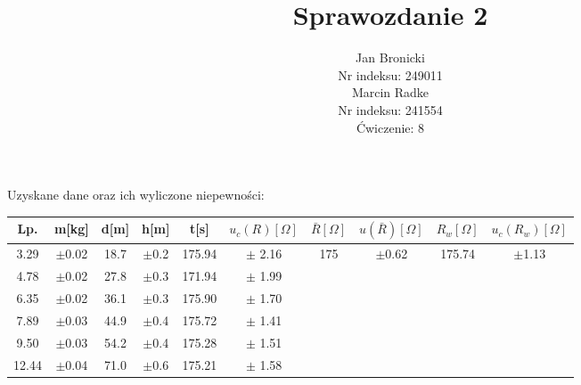 \documentclass{article}
\title{Sprawozdanie 2}
\author{Jan Bronicki \\
Nr indeksu: 249011\\
Marcin Radke\\
Nr indeksu: 241554\\
Ćwiczenie: 8}
\date{}
\begin{document}
\maketitle
\begin{table}[h]
    Uzyskane dane oraz ich wyliczone niepewności:\\
    \renewcommand{\arraystretch}{1.3}
\begin{tabular}{ |c|c|c|c|c|c|c|c|c|c| }
    \hline
    Lp.&m[kg]&d[m]&h[m]&t[s]&$u_c(R)[\Omega]$&$\bar{R}[\Omega]$&$u(\bar{R})[\Omega]$&$R_w[\Omega]$&$u_c(R_w)[\Omega]$ \\
    \hline \hline
    3.29&$\pm$0.02&18.7&$\pm$0.2&175.94&$\pm$ 2.16& \multirow{6}{*}{175}&\multirow{6}{*}{$\pm$0.62}&\multirow{6}{*}{175.74}&\multirow{6}{*}{$\pm$1.13}\\ 
    \cline{1-6}

    4.78&$\pm$0.02&27.8&$\pm$0.3&171.94&$\pm$ 1.99&&&&\\ 
    \cline{1-6}
  
    6.35&$\pm$0.02&36.1&$\pm$0.3&175.90&$\pm$ 1.70&&&&\\ 
    \cline{1-6}

    7.89&$\pm$0.03&44.9&$\pm$0.4&175.72&$\pm$ 1.41&&&&\\ 
    \cline{1-6}

    9.50&$\pm$0.03&54.2&$\pm$0.4&175.28&$\pm$ 1.51&&&&\\ 
    \cline{1-6}
    
    12.44&$\pm$0.04&71.0&$\pm$0.6&175.21&$\pm$ 1.58&&&&\\ 

    \hline
\end{tabular}
\label{tabular: t}
\end{table}
\end{document}
